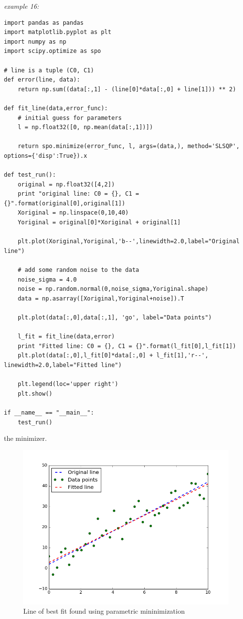 \noindent\begin{minipage}{\linewidth}
\noindent\textit{example 16:}
\begin{lstlisting}[style=python]
import pandas as pandas
import matplotlib.pyplot as plt
import numpy as np
import scipy.optimize as spo

# line is a tuple (C0, C1)
def error(line, data):
	return np.sum((data[:,1] - (line[0]*data[:,0] + line[1])) ** 2)

def fit_line(data,error_func):
	# initial guess for parameters
	l = np.float32([0, np.mean(data[:,1])])

	return spo.minimize(error_func, l, args=(data,), method='SLSQP', options={'disp':True}).x

def test_run():
	original = np.float32([4,2])
	print "original line: C0 = {}, C1 = {}".format(original[0],original[1])
	Xoriginal = np.linspace(0,10,40)
	Yoriginal = original[0]*Xoriginal + original[1]

	plt.plot(Xoriginal,Yoriginal,'b--',linewidth=2.0,label="Original line")

	# add some random noise to the data
	noise_sigma = 4.0
	noise = np.random.normal(0,noise_sigma,Yoriginal.shape)
	data = np.asarray([Xoriginal,Yoriginal+noise]).T

	plt.plot(data[:,0],data[:,1], 'go', label="Data points")

	l_fit = fit_line(data,error)
	print "Fitted line: C0 = {}, C1 = {}".format(l_fit[0],l_fit[1])
	plt.plot(data[:,0],l_fit[0]*data[:,0] + l_fit[1],'r--', linewidth=2.0,label="Fitted line")

	plt.legend(loc='upper right')
	plt.show()

if __name__ == "__main__":
	test_run()
\end{lstlisting}
\end{minipage}
 the minimizer.
\begin{figure}[h!]
	\centering
	\includegraphics[width=\linewidth]{images/line_fit.png}
    \caption{Line of best fit found using parametric mininimization}
\end{figure}
\newpage

